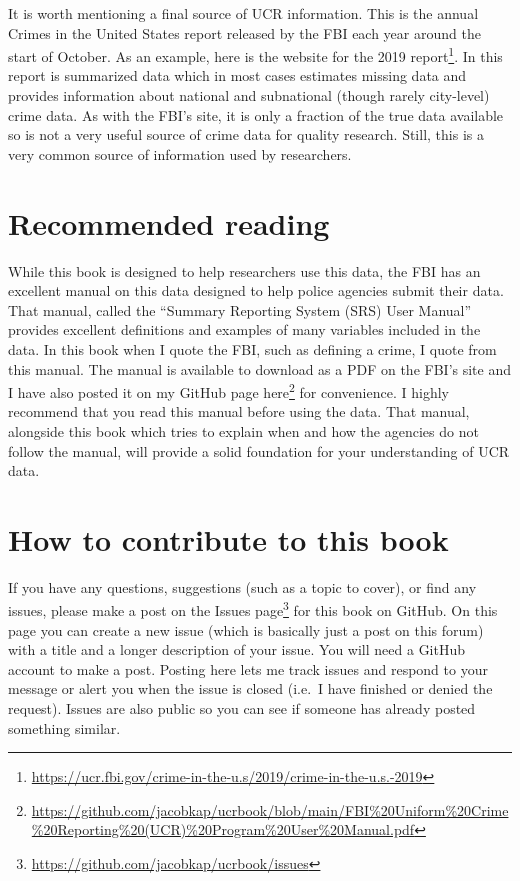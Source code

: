 \documentclass[
]{krantz}
\renewcommand{\href}[2]{#2\footnote{\url{#1}}}
\begin{document}
It is worth mentioning a final source of UCR information.
This is the annual Crimes in the United States report
released by the FBI each year around the start of October.
As an example, here is the
\href{https://ucr.fbi.gov/crime-in-the-u.s/2019/crime-in-the-u.s.-2019}{website
for the 2019 report}. In this report is summarized data
which in most cases estimates missing data and provides
information about national and subnational (though rarely
city-level) crime data. As with the FBI's site, it is only a
fraction of the true data available so is not a very useful
source of crime data for quality research. Still, this is a
very common source of information used by researchers.

\section{Recommended reading}\label{recommended-reading}

While this book is designed to help researchers use this
data, the FBI has an excellent manual on this data designed
to help police agencies submit their data. That manual,
called the ``Summary Reporting System (SRS) User Manual''
provides excellent definitions and examples of many
variables included in the data. In this book when I quote
the FBI, such as defining a crime, I quote from this manual.
The manual is available to download as a PDF on the FBI's
site and I have also posted it on my GitHub page
\href{https://github.com/jacobkap/ucrbook/blob/main/FBI\%20Uniform\%20Crime\%20Reporting\%20(UCR)\%20Program\%20User\%20Manual.pdf}{here}
for convenience. I highly recommend that you read this
manual before using the data. That manual, alongside this
book which tries to explain when and how the agencies do not
follow the manual, will provide a solid foundation for your
understanding of UCR data.

\section{How to contribute to this
book}\label{how-to-contribute-to-this-book}

If you have any questions, suggestions (such as a topic to
cover), or find any issues, please make a post on the
\href{https://github.com/jacobkap/ucrbook/issues}{Issues
page} for this book on GitHub. On this page you can create a
new issue (which is basically just a post on this forum)
with a title and a longer description of your issue. You
will need a GitHub account to make a post. Posting here lets
me track issues and respond to your message or alert you
when the issue is closed (i.e.~I have finished or denied the
request). Issues are also public so you can see if someone
has already posted something similar.
\end{document}
